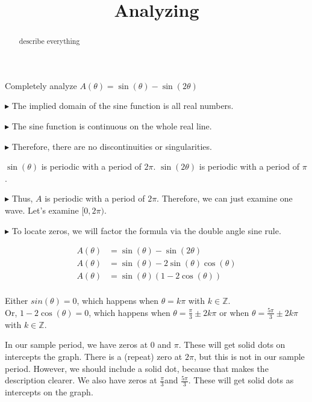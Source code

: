 \documentclass{ximera}
\title{Analyzing}
\begin{document}
\begin{abstract}
describe everything
\end{abstract}
\maketitle







Completely analyze $A(\theta) = \sin(\theta) - \sin(2\theta)$

$\blacktriangleright$  The implied domain of the sine function is all real numbers.

$\blacktriangleright$ The sine function is continuous on the whole real line.

$\blacktriangleright$  Therefore, there are no discontinuities or singularities.


$\sin(\theta)$ is periodic with a period of $2\pi$. $\sin(2\theta)$ is periodic with a period of $\pi$. 

$\blacktriangleright$ Thus, $A$ is periodic with a period of $2\pi$.  Therefore, we can just examine one wave.  Let's examine $[0,2\pi)$.






$\blacktriangleright$ To locate zeros, we will factor the formula via the double angle sine rule.  




\begin{align*}
A(\theta)   &  = \sin(\theta) - \sin(2\theta)  \\
A(\theta)   &  = \sin(\theta) - 2\sin(\theta)\cos(\theta)   \\
A(\theta)   &  = \sin(\theta) (1 - 2\cos(\theta))   \\
\end{align*}



Either $sin(\theta) = 0$, which happens when $\theta = k\pi$ with $k \in \mathbb{Z}$. \\
Or, $1 - 2\cos(\theta) = 0$, which happens when $\theta = \frac{\pi}{3} \pm 2k\pi$ or when $\theta = \frac{5\pi}{3} \pm 2k\pi$ with $k \in \mathbb{Z}$.

In our sample period, we have zeros at $0$ and $\pi$. These will get solid dots on intercepts the graph.  There is a (repeat) zero at $2\pi$, but this is not in our sample period.  However, we should include a solid dot, because that makes the description clearer.  We also have zeros at $\frac{\pi}{3}$and $\frac{5\pi}{3}$.  These will get solid dots as intercepts on the graph.
\end{document}
